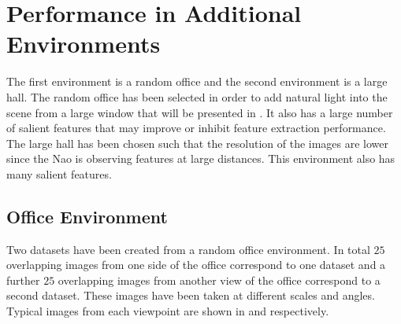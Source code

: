 \documentclass{report}
\begin{document}
\section{Performance in Additional Environments}
\label{sec:additionalDataset}
The first environment is a random office and the second environment is a large hall. The random office has been selected in order to add natural light into the scene from a large window that will be presented in . It also has a large number of salient features that may improve or inhibit feature extraction performance. The large hall has been chosen such that the resolution of the images are lower since the Nao is observing features at large distances. This environment also has many salient features. \\

\subsection{Office Environment}
\label{sec:office}
Two datasets have been created from a random office environment. In total $25$ overlapping images from one side of the office correspond to one dataset and a further $25$ overlapping images from another view of the office correspond to a second dataset. These images have been taken at different scales and angles. Typical images from each viewpoint are shown in  and  respectively.\\
\end{document}
